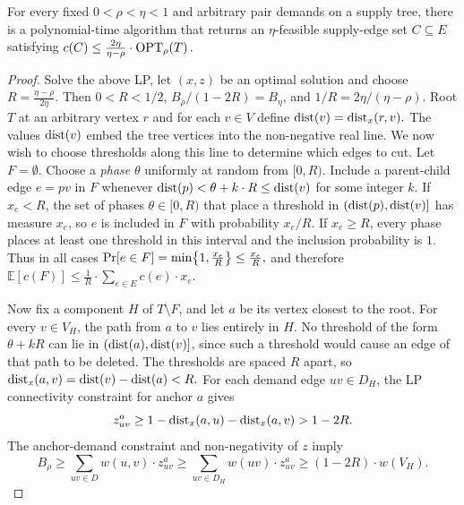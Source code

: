 \begin{theorem}\label{thm:tree-anchored-rounding}
    For every fixed $0<\rho<\eta<1$ and arbitrary pair demands on a supply tree, there is a polynomial-time algorithm that returns an $\eta$-feasible supply-edge set $C\subseteq E$ satisfying $
        c(C)\leq\frac{2\eta}{\eta-\rho}\cdot \textup{OPT}_{\rho}\mathopen{}\left( T \right).$
\end{theorem}
\begin{proof}
    Solve the above LP, let $(x,z)$ be an optimal solution and choose $
        R=\frac{\eta-\rho}{2\eta}.$
    Then $0<R<1/2$, $B_\rho/(1-2R)=B_\eta$, and $1/R=2\eta/(\eta-\rho)$.
    Root $T$ at an arbitrary vertex $r$ and for each $v\in V$ define $
        \text{dist}(v)=\text{dist}_x(r,v).
    $
    The values $\text{dist}(v)$ embed the tree vertices into the non-negative real line. 
    We now wish to choose thresholds along this line to determine which edges to cut. Let $F=\emptyset$.
    Choose a \emph{phase} $\theta$ uniformly at random from $[0,R)$. Include a parent-child edge $e=pv$ in $F$ whenever $\text{dist}(p)<\theta+k\cdot R\leq \text{dist}(v)$
    for some integer $k$. If $x_e<R$, the set of phases $\theta\in[0,R)$ that place a threshold in $(\text{dist}(p),\text{dist}(v)]$ has measure $x_e$, so $e$ is included in $F$ with probability $x_e/R$. If $x_e\geq R$, every phase places at least one threshold in this interval and the inclusion probability is $1$. Thus in all cases $
        \Pr[e\in F]=\min\mathopen{}\left\{ 1,\frac{x_e}{R} \right\}\leq\frac{x_e}{R},$
    and therefore $
        \mathbb{E}[c(F)]\leq\frac{1}{R}\cdot \sum_{e\in E}c(e)\cdot x_e.
    $

    Now fix a component $H$ of $T\setminus F$, and let $a$ be its vertex closest to the root. For every $v\in V_H$, the path from $a$ to $v$ lies entirely in $H$. No threshold of the form $\theta+kR$ can lie in $(\text{dist}(a),\text{dist}(v)]$, since such a threshold would cause an edge of that path to be deleted. The thresholds are spaced $R$ apart, so $
        \text{dist}_x(a,v)=\text{dist}(v)-\text{dist}(a)<R.
    $
    For each demand edge $uv\in D_H$, the LP connectivity constraint for anchor $a$ gives
    \[
        z^a_{uv}\geq1-\text{dist}_x(a,u)-\text{dist}_x(a,v)>1-2R.
    \]
    The anchor-demand constraint and non-negativity of $z$ imply
    \[
        B_\rho\geq\sum_{uv\in D}w(u,v)\cdot z^a_{uv}
          \geq\sum_{uv\in D_H}w(uv)\cdot z^a_{uv}
          \geq(1-2R)\cdot w(V_H).
    \]


\end{proof}
